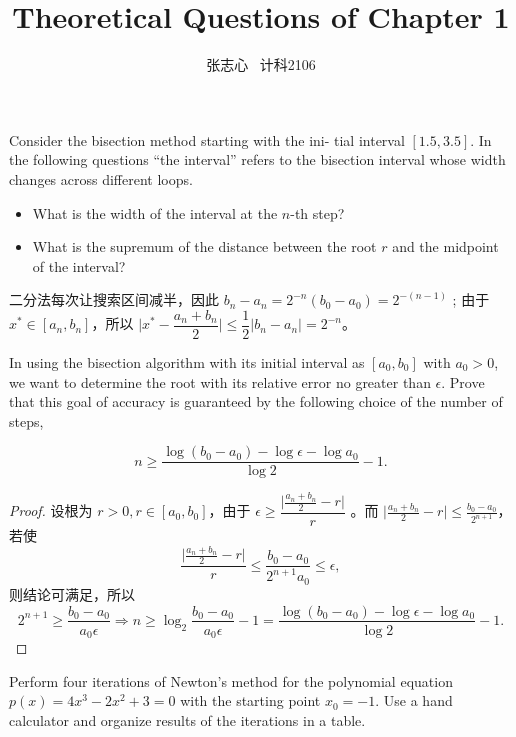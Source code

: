 \documentclass[lang=cn,a4paper,newtx,bibend=bibtex]{elegantpaper}
\title{Theoretical Questions of Chapter 1}
\author{张志心 \ 计科2106}
\date{\zhdate{2023/09/26}}
\begin{document}
\maketitle



\begin{prob}[1.8.1-\textrm{I}.]
Consider the bisection method starting with the ini-
 tial interval $[1.5, 3.5]$. In the following questions “the
 interval” refers to the bisection interval whose width
 changes across different loops.
 \begin{itemize}
    \item What is the width of the interval at the $n$-th step?
    \item What is the supremum of the distance between
    the root $r$ and the midpoint of the interval?
 \end{itemize}
\end{prob}

\begin{solution}
    二分法每次让搜索区间减半，因此 $b_n-a_n = 2^{-n}(b_0 - a_0) = 2^{-(n-1)}$ ;
    由于 $x^* \in [a_n, b_n]$，所以 $\vert x^* - \dfrac{a_n + b_n}{2}\vert \le \dfrac12 \vert b_n - a_n\vert = 2^{-n}$。
\end{solution}

\begin{prob}[1.8.1-\textrm{II}.]
    In using the bisection algorithm with its initial interval
    as $[a_0, b_0]$ with $a_0 > 0$, we want to determine the root
    with its relative error no greater than $\epsilon$. Prove that this
    goal of accuracy is guaranteed by the following choice
    of the number of steps,

    \[
        n\ge \dfrac{\log(b_0 - a_0)-\log \epsilon - \log a_0}{\log 2} - 1.
    \]

\end{prob}
    
\begin{proof}
设根为 $r>0,r\in[a_0, b_0]$，由于 $\epsilon \ge \dfrac{\vert\frac{a_n+b_n}{2}-r\vert}{r}$
。而 $\vert\frac{a_n+b_n}{2}-r\vert \le \frac{b_0-a_0}{2^{n+1}}$，
若使
\[
    \dfrac{\vert\frac{a_n+b_n}{2}-r\vert}{r}\le \frac{b_0-a_0}{2^{n+1}a_0} \le \epsilon,
\]
则结论可满足，所以
\[
    2^{n+1}\ge \dfrac{b_0-a_0}{a_0\epsilon} \Rightarrow
    n\ge \log_2 {\dfrac{b_0-a_0}{a_0\epsilon}} - 1 = \dfrac{\log(b_0-a_0)-\log \epsilon-\log a_0}{\log 2}-1.
\]
\end{proof}


\begin{prob}
        Perform four iterations of Newton’s method for the
        polynomial equation $p(x) = 4x^3 - 2x^2 + 3 = 0$ with
 the starting point $x_0 = -1$. Use a hand calculator and
organize results of the iterations in a table.
\end{prob}
        
\end{document}
